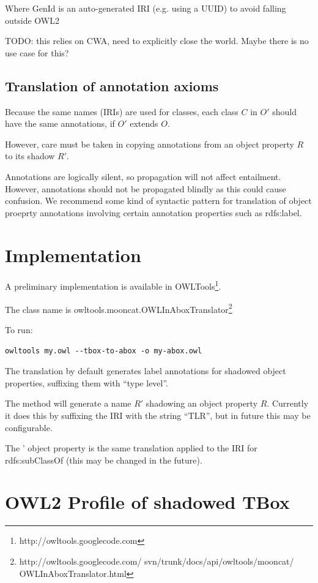 \documentclass{my}
\def\SubClassOf{\pr{SubClassOf}}
\begin{document}
Where GenId is an auto-generated IRI (e.g. using a UUID) to avoid falling outside OWL2

TODO: this relies on CWA, need to explicitly close the world. Maybe
there is no use case for this?

\subsection{Translation of annotation axioms}

Because the same names (IRIs) are used for classes, each class $C$ in
$O'$ should have the same annotations, if $O'$ extends $O$.

However, care must be taken in copying annotations from an object
property $R$ to its shadow $R'$.

Annotations are logically silent, so propagation will not affect
entailment. However, annotations should not be propagated blindly as
this could cause confusion. We recommend some kind of syntactic
pattern for translation of object proeprty annotations involving
certain annotation properties such as rdfs:label.

\section{Implementation}

A preliminary implementation is available in
OWLTools\footnote{http://owltools.googlecode.com}.

The class name is
owltools.mooncat.OWLInAboxTranslator\footnote{http://owltools.googlecode.com/ 
svn/trunk/docs/api/owltools/mooncat/ OWLInAboxTranslator.html}

To run:
\begin{verbatim}
owltools my.owl --tbox-to-abox -o my-abox.owl
\end{verbatim}

The translation by default generates label annotations for shadowed
object properties, suffixing them with ``type level''.

The method  will generate a name $R'$ shadowing an
object property $R$. Currently it does this by suffixing the IRI with
the string ``TLR'', but in future this may be configurable.

The \SubClassOf' object property is the same translation applied to
the IRI for rdfs:subClassOf (this may be changed in the future).

\section{OWL2 Profile of shadowed TBox}
\end{document}
